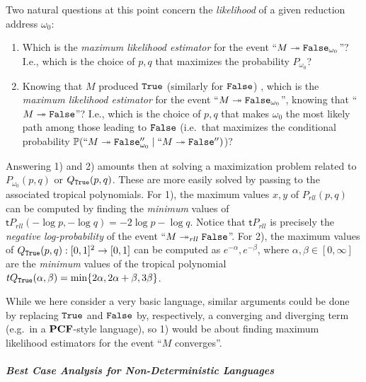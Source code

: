 Two natural questions at this point concern the \emph{likelihood} of a given reduction address $\omega_{0}$:
%
\begin{enumerate}
 \item Which is the \emph{maximum likelihood estimator} for the event ``$M\twoheadrightarrow \mathtt{False}_{\omega_0}$''?
 I.e., which is the choice of $p,q$ that maximizes the probability $P_{\omega_0}$?
 \item 
Knowing that $M$ produced $\mathtt{True}$ (similarly for $\mathtt{False}$) , which is the \emph{maximum likelihood estimator} for the event ``$M\twoheadrightarrow \mathtt{False}_{\omega_0}$'', knowing that ``$M\twoheadrightarrow \mathtt{False}$''?
I.e., which is the choice of $p,q$ that makes $\omega_0$ the most likely path among those leading to $\mathtt{False}$ (i.e.\ that maximizes the conditional probability $\mathbb{P}(``M\twoheadrightarrow \mathtt{False}_{\omega_0}'' \mid ``M\twoheadrightarrow \mathtt{False}'')$)?
\end{enumerate}


Answering 1) and 2) amounts then at solving a maximization problem related to $P_{\omega_{0}}(p,q)$ or $Q_{\mathtt{True}}(p,q)$. These are more easily solved by passing to the associated tropical polynomials.
For 1), the maximum values $x,y$ of $P_{rll}(p,q)$ can be computed by finding the \emph{minimum} values of $\mathsf tP_{rll}(-\log p, -\log q)= -2\log p- \log q$. Notice that $\mathsf tP_{rll}$ is precisely the \emph{negative log-probability} of the event ``$M\twoheadrightarrow_{rll} \mathtt{False}$''. For 2), the maximum values of $Q_{\mathtt{True}}(p,q): [0,1]^{2}\to [0,1]$ can be computed as $e^{-\alpha},e^{-\beta}$, where $\alpha,\beta\in[0,\infty]$ are the \emph{minimum} values of the tropical polynomial 
$\mathsf t Q_{\true}(\alpha,\beta) = \min \{ 2\alpha, 2\alpha+\beta, 3\beta\}$.




While we here consider a very basic language, similar arguments could be done by replacing $\mathtt{True}$ and $\mathtt{False}$ by, respectively, a converging and diverging term (e.g.~in a $\mathbf{PCF}$-style language), so 1) would be about finding maximum likelihood estimators for the event ``$M$ converges''.


\subparagraph*{Best Case Analysis for Non-Deterministic Languages}

